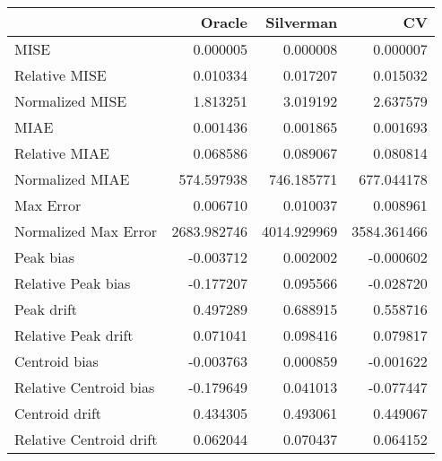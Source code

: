 \begin{tabular}{lrrr}
  \hline
 & Oracle & Silverman & CV \\ 
  \hline
MISE & 0.000005 & 0.000008 & 0.000007 \\ 
  Relative MISE & 0.010334 & 0.017207 & 0.015032 \\ 
  Normalized MISE & 1.813251 & 3.019192 & 2.637579 \\ 
  MIAE & 0.001436 & 0.001865 & 0.001693 \\ 
  Relative MIAE & 0.068586 & 0.089067 & 0.080814 \\ 
  Normalized MIAE & 574.597938 & 746.185771 & 677.044178 \\ 
  Max Error & 0.006710 & 0.010037 & 0.008961 \\ 
  Normalized Max Error & 2683.982746 & 4014.929969 & 3584.361466 \\ 
  Peak bias & -0.003712 & 0.002002 & -0.000602 \\ 
  Relative Peak bias & -0.177207 & 0.095566 & -0.028720 \\ 
  Peak drift & 0.497289 & 0.688915 & 0.558716 \\ 
  Relative Peak drift & 0.071041 & 0.098416 & 0.079817 \\ 
  Centroid bias & -0.003763 & 0.000859 & -0.001622 \\ 
  Relative Centroid bias & -0.179649 & 0.041013 & -0.077447 \\ 
  Centroid drift & 0.434305 & 0.493061 & 0.449067 \\ 
  Relative Centroid drift & 0.062044 & 0.070437 & 0.064152 \\ 
   \hline
\end{tabular}
